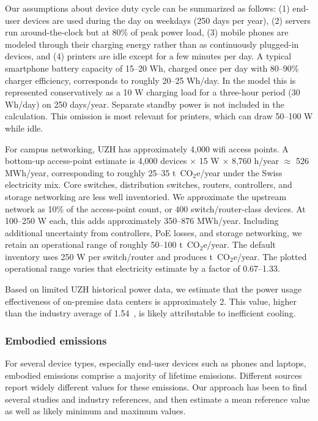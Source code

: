 \documentclass[11pt]{article}
\let\cite\parencite
\newcommand{\coe}{CO$_2$e}
\newcommand{\tcoe}{t~\coe}
\begin{document}
Our assumptions about device duty cycle can be summarized as follows: (1)
end-user devices are used during the day on weekdays (250 days per year), (2)
servers run around-the-clock but at 80\% of peak power load, (3) mobile phones
are modeled through their charging energy rather than as continuously plugged-in
devices, and (4) printers are idle except for a few minutes per day. A typical
smartphone battery capacity of 15--20 Wh, charged once per day with 80--90\%
charger efficiency, corresponds to roughly 20--25 Wh/day. In the model this is
represented conservatively as a 10 W charging load for a three-hour period
(30 Wh/day) on 250 days/year. Separate standby power is not included in the
calculation. This omission is most relevant for printers, which can draw
50--100 W while idle.

For campus networking, UZH has approximately 4,000 wifi access points. A
bottom-up access-point estimate is 4,000 devices $\times$ 15 W $\times$ 8,760
h/year $\approx$ 526 MWh/year, corresponding to roughly 25--35 \tcoe/year under
the Swiss electricity mix. Core switches, distribution switches, routers,
controllers, and storage networking are less well inventoried. We approximate
the upstream network as 10\% of the access-point count, or 400
switch/router-class devices. At 100--250 W each, this adds approximately
350--876 MWh/year. Including additional uncertainty from controllers, PoE
losses, and storage networking, we retain an operational range of roughly
50--100 \tcoe/year. The default inventory uses 250 W per switch/router and
produces \ModelNetworkOperationalT{} \tcoe/year. The plotted operational range
varies that electricity estimate by a factor of 0.67--1.33.

Based on limited UZH historical power data, we estimate that the power usage
effectiveness of on-premise data centers is approximately 2. This value, higher
than the industry average of 1.54~\cite{google:datacenter:efficiency}, is
likely attributable to inefficient cooling.

\subsubsection*{Embodied emissions}

For several device types, especially end-user devices such as phones and
laptops, embodied emissions comprise a majority of lifetime emissions. Different
sources report widely different values for these emissions. Our approach has
been to find several studies and industry references, and then estimate a mean
reference value as well as likely minimum and maximum values.
\end{document}
